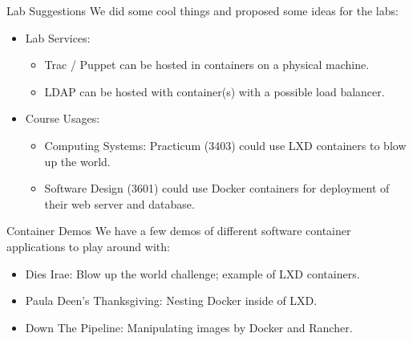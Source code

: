 \documentclass[xcolor=dvipsnames,aspectratio=1610]{beamer}
\begin{document}
  \begin{frame}{Lab Suggestions}
    We did some cool things and proposed some ideas for the labs:

    \begin{itemize}
        \item \alert{Lab Services}:
        \begin{itemize}
            \item Trac / Puppet can be hosted in containers on a physical machine.
            \item LDAP can be hosted with container(s) with a possible load balancer.
        \end{itemize}

        \item \alert{Course Usages}:
        \begin{itemize}
            \item Computing Systems: Practicum (3403) could use LXD containers to blow up the world.
            \item Software Design (3601) could use Docker containers for deployment of their web server and database.
        \end{itemize}
    \end{itemize}
  \end{frame}

  \begin{frame}{Container Demos}
      We have a few demos of different software container applications to play around with: \newline
      \begin{itemize}
        \setlength\itemsep{1.6em}
        \item Dies Irae: Blow up the world challenge; example of LXD containers.
        \item Paula Deen's Thanksgiving: Nesting Docker inside of LXD.
        \item Down The Pipeline: Manipulating images by Docker and Rancher.
      \end{itemize}

  \end{frame}
\end{document}
